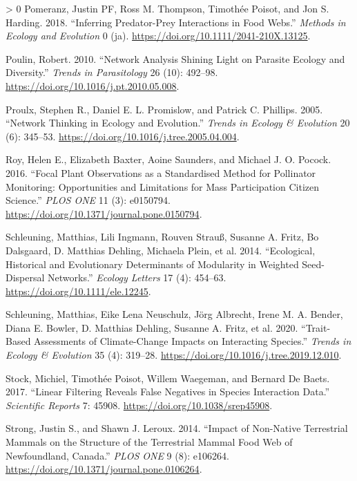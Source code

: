 \documentclass[10pt,oneside]{article}
\newlength{\cslhangindent}
\newenvironment{CSLReferences}[3] %
 {%
  \setlength{\parindent}{0pt}
  \ifodd #1 \everypar{\setlength{\hangindent}{\cslhangindent}}\ignorespaces\fi
  \ifnum #2 > 0
  \setlength{\parskip}{#2\baselineskip}
  \fi
 }%
 {}
\begin{document}
\begin{CSLReferences}{1}{0}
\leavevmode\hypertarget{ref-Pomeranz2018InfPre}{}%
Pomeranz, Justin PF, Ross M. Thompson, Timothée Poisot, and Jon S.
Harding. 2018. {``Inferring Predator-Prey Interactions in Food Webs.''}
\emph{Methods in Ecology and Evolution} 0 (ja).
\url{https://doi.org/10.1111/2041-210X.13125}.

\leavevmode\hypertarget{ref-Poulin2010NetAna}{}%
Poulin, Robert. 2010. {``Network Analysis Shining Light on Parasite
Ecology and Diversity.''} \emph{Trends in Parasitology} 26 (10):
492--98. \url{https://doi.org/10.1016/j.pt.2010.05.008}.

\leavevmode\hypertarget{ref-Proulx2005NetThi}{}%
Proulx, Stephen R., Daniel E. L. Promislow, and Patrick C. Phillips.
2005. {``Network Thinking in Ecology and Evolution.''} \emph{Trends in
Ecology \& Evolution} 20 (6): 345--53.
\url{https://doi.org/10.1016/j.tree.2005.04.004}.

\leavevmode\hypertarget{ref-Roy2016FocPla}{}%
Roy, Helen E., Elizabeth Baxter, Aoine Saunders, and Michael J. O.
Pocock. 2016. {``Focal Plant Observations as a Standardised Method for
Pollinator Monitoring: Opportunities and Limitations for Mass
Participation Citizen Science.''} \emph{PLOS ONE} 11 (3): e0150794.
\url{https://doi.org/10.1371/journal.pone.0150794}.

\leavevmode\hypertarget{ref-Schleuning2014EcoHis}{}%
Schleuning, Matthias, Lili Ingmann, Rouven Strauß, Susanne A. Fritz, Bo
Dalsgaard, D. Matthias Dehling, Michaela Plein, et al. 2014.
{``Ecological, Historical and Evolutionary Determinants of Modularity in
Weighted Seed-Dispersal Networks.''} \emph{Ecology Letters} 17 (4):
454--63. \url{https://doi.org/10.1111/ele.12245}.

\leavevmode\hypertarget{ref-Schleuning2020TraAss}{}%
Schleuning, Matthias, Eike Lena Neuschulz, Jörg Albrecht, Irene M. A.
Bender, Diana E. Bowler, D. Matthias Dehling, Susanne A. Fritz, et al.
2020. {``Trait-Based Assessments of Climate-Change Impacts on
Interacting Species.''} \emph{Trends in Ecology \& Evolution} 35 (4):
319--28. \url{https://doi.org/10.1016/j.tree.2019.12.010}.

\leavevmode\hypertarget{ref-Stock2017LinFil}{}%
Stock, Michiel, Timothée Poisot, Willem Waegeman, and Bernard De Baets.
2017. {``Linear Filtering Reveals False Negatives in Species Interaction
Data.''} \emph{Scientific Reports} 7: 45908.
\url{https://doi.org/10.1038/srep45908}.

\leavevmode\hypertarget{ref-Strong2014ImpNon}{}%
Strong, Justin S., and Shawn J. Leroux. 2014. {``Impact of Non-Native
Terrestrial Mammals on the Structure of the Terrestrial Mammal Food Web
of Newfoundland, Canada.''} \emph{PLOS ONE} 9 (8): e106264.
\url{https://doi.org/10.1371/journal.pone.0106264}.


\end{CSLReferences}
\end{document}
